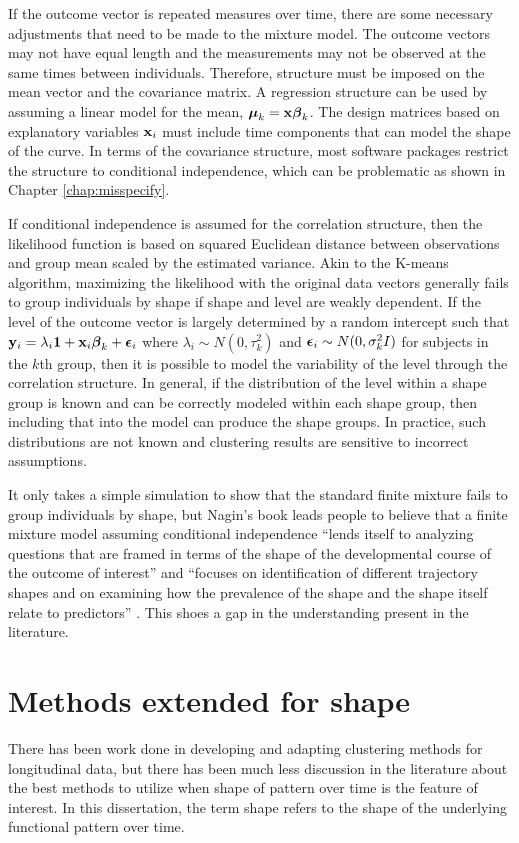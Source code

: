 If the outcome vector is repeated measures over time, there are some necessary adjustments that need to be made to the mixture model. The outcome vectors may not have equal length and the measurements may not be observed at the same times between individuals. Therefore, structure must be imposed on the mean vector and the covariance matrix. A regression structure can be used by assuming a linear model for the mean, $\boldsymbol\mu_k=\mathbf x \boldsymbol\beta_k$. The design matrices based on explanatory variables $\mathbf x_{i}$ must include time components that can model the shape of the curve.  In terms of the covariance structure, most software packages restrict the structure to conditional independence, which can be problematic as shown in Chapter \ref{chap:misspecify}.

If conditional independence is assumed for the correlation structure, then the likelihood function is based on squared Euclidean distance between observations and group mean scaled by the estimated variance. Akin to the K-means algorithm, maximizing the likelihood with the original data vectors generally fails to group individuals by shape if shape and level are weakly dependent. If the level of the outcome vector is largely determined by a random intercept such that $\mathbf y_{i} = \lambda_{i}\mathbf 1+ \mathbf x_{i}\boldsymbol\beta_{k}  +\boldsymbol\epsilon_{i}$ where $\lambda_{i}\sim N(0,\tau^{2}_{k})$ and $\boldsymbol\epsilon_{i}\sim N(0,\sigma^{2}_{k}I)$ for subjects in the $k$th group, then it is possible to model the variability of the level through the correlation structure. In general, if the distribution of the level within a shape group is known and can be correctly modeled within each shape group, then including that into the model can produce the shape groups. In practice, such distributions are not known and clustering results are sensitive to incorrect assumptions.

It only takes a simple simulation to show that the standard finite mixture fails to group individuals by shape, but Nagin's book leads people to believe that a finite mixture model assuming conditional independence ``lends itself to analyzing questions that are framed in terms of the shape of the developmental course of the outcome of interest''  and  ``focuses on identification of different trajectory shapes and on examining how the prevalence of the shape and the shape itself relate to predictors'' \cite{nagin2005}. This shoes a gap in the understanding present in the literature.

\section{Methods extended for shape}
There has been work done in developing and adapting clustering methods for longitudinal data, but there has been much less discussion in the literature about the best methods to utilize when shape of pattern over time is the feature of interest. In this dissertation, the term shape refers to the shape of the underlying functional pattern over time.

